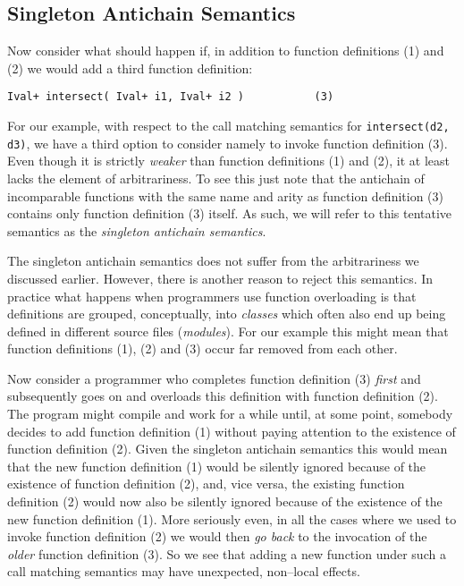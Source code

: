 \documentclass{sigplanconf}
\begin{document}
\subsection{Singleton Antichain Semantics} 

Now consider what should happen if, in addition to function
definitions (1) and (2) we would add a third function definition:
\begin{samepage}
\begin{verbatim}
Ival+ intersect( Ival+ i1, Ival+ i2 )           (3)
\end{verbatim}
\end{samepage}
For our example, with respect to the call matching semantics for
\verb+intersect(d2, d3)+, we have a third option to consider namely to
invoke function definition (3). Even though it is strictly
\emph{weaker} than function definitions (1) and (2), it at least lacks
the element of arbitrariness. To see this just note that the antichain
of incomparable functions with the same name and arity as function
definition (3) contains only function definition (3) itself. As such,
we will refer to this tentative semantics as the \emph{singleton
  antichain semantics}.

The singleton antichain semantics does not suffer from the
arbitrariness we discussed earlier. However, there is another reason
to reject this semantics. In practice what happens when programmers
use function overloading is that definitions are grouped,
conceptually, into \emph{classes} which often also end up being
defined in different source files (\emph{modules}). For our example
this might mean that function definitions (1), (2) and (3) occur far
removed from each other.

Now consider a programmer who completes function definition (3)
\emph{first} and subsequently goes on and overloads this definition
with function definition (2). The program might compile and work for a
while until, at some point, somebody decides to add function
definition (1) without paying attention to the existence of function
definition (2). Given the singleton antichain semantics this would
mean that the new function definition (1) would be silently ignored
because of the existence of function definition (2), and, vice versa,
the existing function definition (2) would now also be silently
ignored because of the existence of the new function definition
(1). More seriously even, in all the cases where we used to invoke
function definition (2) we would then \emph{go back} to the invocation
of the \emph{older} function definition (3). So we see that adding a
new function under such a call matching semantics may have unexpected,
non--local effects.
\end{document}
